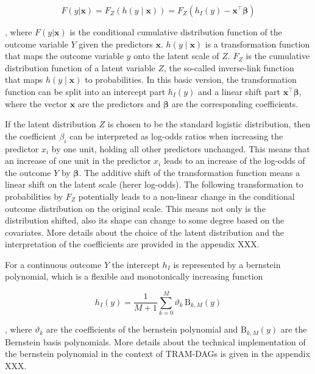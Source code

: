 \begin{equation}
F(y|\mathbf{x}) = F_Z(h(y \mid \mathbf{x})) =  F_Z(h_I(y) - \mathbf{x}^\top \boldsymbol{\beta})
\label{eq:transformation_model}
\end{equation}

, where $F(y|\mathbf{x})$ is the conditional cumulative distribution function of the outcome variable $Y$ given the predictors $\mathbf{x}$. $h(y \mid \mathbf{x})$ is a transformation function that maps the outcome variable $y$ onto the latent scale of $Z$. $F_Z$ is the cumulative distribution function of a latent variable $Z$, the so-called inverse-link function that maps $h(y \mid \mathbf{x})$ to probabilities. In this basic version, the transformation function can be split into an intercept part $h_I(y)$ and a linear shift part $\mathbf{x}^\top \boldsymbol{\beta}$, where the vector $\mathbf{x}$ are the predictors and $\boldsymbol{\beta}$ are the corresponding coefficients.

If the latent distribution $Z$ is chosen to be the standard logistic distribution, then the coefficient $\beta_i$ can be interpreted as log-odds ratios when increasing the predictor $x_i$ by one unit, holding all other predictors unchanged. This means that an increase of one unit in the predictor $x_i$ leads to an increase of the log-odds of the outcome $Y$ by $\boldsymbol{\beta}$. The additive shift of the transformation function means a linear shift on the latent scale (herer log-odds). The following transformation to probabilities by $F_Z$ potentially leads to a non-linear change in the conditional outcome distribution on the original scale. This means not only is the distribution shifted, also its shape can change to some degree based on the covariates. More details about the choice of the latent distribution and the interpretation of the coefficients are provided in the appendix XXX.


For a continuous outcome $Y$ the intercept $h_I$ is represented by a bernstein polynomial, which is a flexible and monotonically increasing function

\begin{equation}
h_I(y) = \frac{1}{M + 1} \sum_{k=0}^{M} \vartheta_k \, \text{B}_{k, M}(y)
\end{equation}

, where $\vartheta_k$ are the coefficients of the bernstein polynomial and $\text{B}_{k, M}(y)$ are the Bernstein basis polynomials. More details about the technical implementation of the bernstein polynomial in the context of TRAM-DAGs is given in the appendix XXX.

